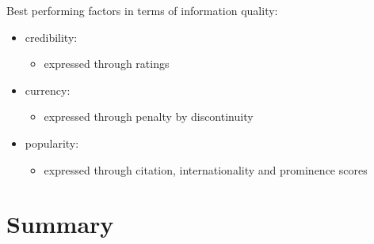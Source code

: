 \documentclass[xcolor={svgnames}]{beamer}
\makeatletter
\newcommand*{\currentname}{\@currentlabelname}
\makeatother
\begin{document}
\begin{frame}{\currentname}\linespread{1.5}
  Best performing factors in terms of information quality:
  \begin{itemize}
    \item credibility:
    \begin{itemize}
      \item expressed through ratings
    \end{itemize}
    \item currency:
    \begin{itemize}
      \item expressed through penalty by discontinuity
    \end{itemize}
    \item popularity:
      \begin{itemize}
        \item expressed through citation, internationality and prominence scores
      \end{itemize}
  \end{itemize}
\end{frame}
%
%
%

\section*{Summary}
\end{document}
